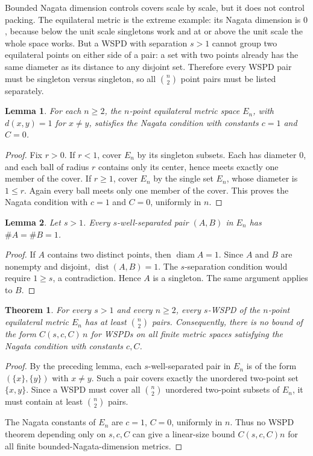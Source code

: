\documentclass[11pt]{article}
\newtheorem{theorem}{Theorem}
\newtheorem{lemma}{Lemma}
\newcommand{\diam}{\operatorname{diam}}
\newcommand{\dist}{\operatorname{dist}}
\begin{document}
Bounded Nagata dimension controls covers scale by scale, but it does not
control packing. The equilateral metric is the extreme example: its Nagata
dimension is \(0\), because below the unit scale singletons work and at or
above the unit scale the whole space works. But a WSPD with separation
\(s>1\) cannot group two equilateral points on either side of a pair: a set
with two points already has the same diameter as its distance to any disjoint
set. Therefore every WSPD pair must be singleton versus singleton, so all
\(\binom n2\) point pairs must be listed separately.

\begin{lemma}
For each \(n\ge2\), the \(n\)-point equilateral metric space \(E_n\), with
\(d(x,y)=1\) for \(x\ne y\), satisfies the Nagata condition with constants
\(c=1\) and \(C=0\).
\end{lemma}

\begin{proof}
Fix \(r>0\). If \(r<1\), cover \(E_n\) by its singleton subsets. Each has
diameter \(0\), and each ball of radius \(r\) contains only its center, hence
meets exactly one member of the cover. If \(r\ge1\), cover \(E_n\) by the
single set \(E_n\), whose diameter is \(1\le r\). Again every ball meets only
one member of the cover. This proves the Nagata condition with \(c=1\) and
\(C=0\), uniformly in \(n\).
\end{proof}

\begin{lemma}
Let \(s>1\). Every \(s\)-well-separated pair \((A,B)\) in \(E_n\) has
\(\#A=\#B=1\).
\end{lemma}

\begin{proof}
If \(A\) contains two distinct points, then \(\diam A=1\). Since \(A\) and
\(B\) are nonempty and disjoint, \(\dist(A,B)=1\). The \(s\)-separation
condition would require \(1\ge s\), a contradiction. Hence \(A\) is a
singleton. The same argument applies to \(B\).
\end{proof}

\begin{theorem}
For every \(s>1\) and every \(n\ge2\), every \(s\)-WSPD of the \(n\)-point
equilateral metric \(E_n\) has at least \(\binom n2\) pairs. Consequently,
there is no bound of the form \(C(s,c,C)\,n\) for WSPDs on all finite metric
spaces satisfying the Nagata condition with constants \(c,C\).
\end{theorem}

\begin{proof}
By the preceding lemma, each \(s\)-well-separated pair in \(E_n\) is of the
form \((\{x\},\{y\})\) with \(x\ne y\). Such a pair covers exactly the unordered
two-point set \(\{x,y\}\). Since a WSPD must cover all \(\binom n2\) unordered
two-point subsets of \(E_n\), it must contain at least \(\binom n2\) pairs.

The Nagata constants of \(E_n\) are \(c=1\), \(C=0\), uniformly in \(n\). Thus
no WSPD theorem depending only on \(s,c,C\) can give a linear-size bound
\(C(s,c,C)n\) for all finite bounded-Nagata-dimension metrics.
\end{proof}
\end{document}
